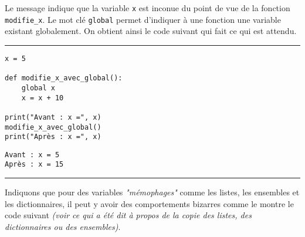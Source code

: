 Le message indique que la variable \texttt{x} est inconue du point de vue de la fonction \texttt{modifie\_x}. Le mot clé \texttt{global} permet d'indiquer à une fonction une variable existant globalement. On obtient ainsi le code suivant qui fait ce qui est attendu.


\newpage

\bigskip
{\hrule height .5mm}
\begin{verbatim}
x = 5

def modifie_x_avec_global():
    global x
    x = x + 10

print("Avant : x =", x)
modifie_x_avec_global()
print("Après : x =", x)
\end{verbatim}
 \color{ForestGreen}
\vspace{-1.5em}
\begin{verbatim}
Avant : x = 5
Après : x = 15
\end{verbatim} \color{Black}
{\hrule height .5mm}
\bigskip


Indiquons que pour des variables \textit{"mémophages"} comme les listes, les ensembles et les dictionnaires, il peut y avoir des comportements bizarres comme le montre le code suivant \textit{(voir ce qui a été dit à propos de la copie des listes, des dictionnaires ou des ensembles)}.


